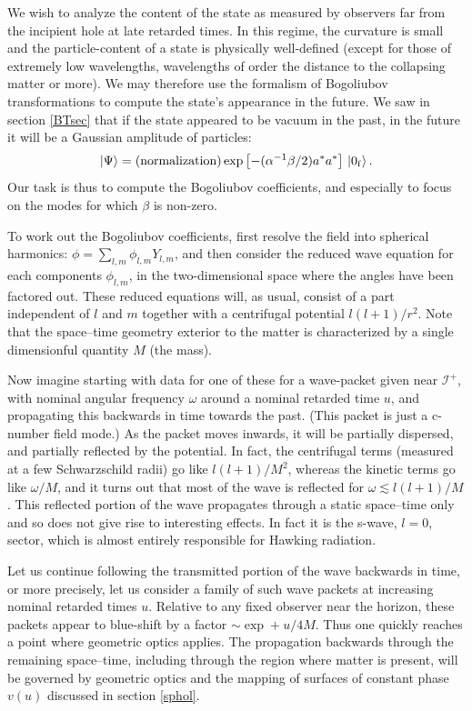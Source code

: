 \documentclass[12pt]{article}
\newcommand{\scrif}{{{\mathscr I}^{+}}}
\newcommand{\vv}{{v}}
\begin{document}
We wish to analyze the content of the state as measured by observers far from the incipient hole at late retarded times.  In this regime, the curvature is small and the particle-content of a state is physically well-defined (except for those of extremely low wavelengths, wavelengths of order the distance to the collapsing matter or more).  
We may therefore use the formalism of Bogoliubov transformations to compute the state's appearance in the future.  We saw in section \ref{BTsec} that if the state appeared to be vacuum in the past, in the future it will be a Gaussian amplitude of particles:
\begin{equation}
|\Psi \rangle =\mbox{(normalization)}\exp \left[-(\alpha ^{-1}\beta /2)a^*a^*\right]\, |0_{\rm f}\rangle\, .
\end{equation}
Our task is thus to compute the Bogoliubov coefficients, and especially to focus on the modes for which $\beta$ is non-zero.

To work out the Bogoliubov coefficients, first resolve the field into spherical harmonics:
$\phi =\sum _{l,m}\phi _{l,m} Y_{l,m}$, and then consider the reduced wave equation for each components $\phi _{l,m}$, in the two-dimensional space where the angles have been factored out.  These reduced equations will, as usual, consist of a part independent of $l$ and $m$ together with a centrifugal potential $l(l+1)/r^2$.
Note that the space--time geometry exterior to the matter is characterized by a single dimensionful quantity $M$ (the mass).



Now imagine starting with data for one of these for a wave-packet given near $\scrif$, with nominal angular frequency $\omega$ around a nominal retarded time $u$,
and propagating this backwards in time towards the past.
(This packet is just a c-number field mode.)
As the packet moves inwards, it will be partially dispersed, and partially reflected by the potential.  
In fact, the centrifugal terms (measured at a few Schwarzschild radii) go like $l(l+1)/M^2$, whereas the kinetic terms go like $\omega /M$, and it turns out that most of the wave is reflected for $\omega \lesssim l(l+1)/M$.  This reflected portion of the wave propagates through a static space--time only and so does not give rise to interesting effects.  In fact it is the s-wave, $l=0$, sector, which is almost entirely responsible for Hawking radiation.

Let us continue following the transmitted portion of the wave backwards in time, or more precisely, let us consider a family of such wave packets at increasing nominal retarded times $u$.
Relative to any fixed observer near the horizon, these packets appear to blue-shift by a factor $\sim\exp +u/4M$.  Thus one quickly reaches a point where geometric optics applies.  The propagation backwards through the remaining space--time, including through the region where matter is present, will be governed by geometric optics and the mapping of surfaces of constant phase $\vv (u)$ discussed in section \ref{sphol}.
\end{document}
